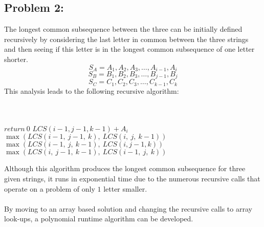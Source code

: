 \documentclass[12pt]{article}
\begin{document}
\subsection*{Problem 2:}
The longest common subsequence between the three can be
initially defined recursively by considering the last 
letter in common between the three strings and then 
seeing if this letter is in the longest common subsequence
of one letter shorter.
\[
S_A = A_1, A_2, A_3,\dots,A_{i-1},A_i
\]
\[
S_B = B_1, B_2, B_3,\dots,B_{j-1},B_j
\]
\[
S_C = C_1, C_2, C_3,\dots,C_{k-1},C_k
\]
This analysis leads to the following recursive algorithm:\\\\
\begin{algorithm}[H]
\\
{$return\ 0$}
{$LCS(i-1,j-1,k-1) + A_i$}
{$\max(LCS(i-1,\ j-1,\ k),\ LCS(i,\ j,\ k-1))$}
{$\max(LCS(i-1,\ j,\ k-1),\ LCS(i, j-1, k))$}
{$\max(LCS(i,\ j-1,\ k-1),\ LCS(i-1,\ j,\ k))$}
\end{algorithm}
Although this algorithm produces the longest common subsequence for
three given strings, it runs in exponential time due to the numerous
recursive calls that operate on a problem of only $1$ letter smaller.\\\\
By moving to an array based solution and changing the recursive calls 
to array look-ups, a polynomial runtime algorithm can be developed.
%
\end{document}
